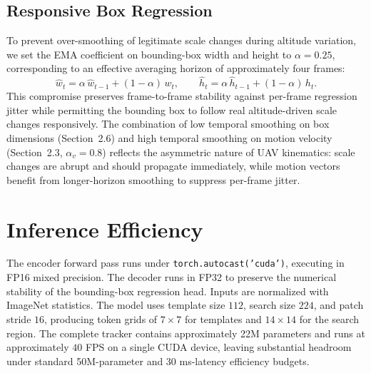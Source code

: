 \documentclass[10pt,twocolumn,letterpaper]{article}
\begin{document}
\subsection{Responsive Box Regression}

To prevent over-smoothing of legitimate scale changes during altitude variation, we set the EMA coefficient on bounding-box width and height to $\alpha = 0.25$, corresponding to an effective averaging horizon of approximately four frames:
\begin{equation}
\hat{w}_t = \alpha\, \hat{w}_{t-1} + (1-\alpha)\, w_t, \qquad
\hat{h}_t = \alpha\, \hat{h}_{t-1} + (1-\alpha)\, h_t.
\end{equation}
This compromise preserves frame-to-frame stability against per-frame regression jitter while permitting the bounding box to follow real altitude-driven scale changes responsively. The combination of low temporal smoothing on box dimensions (Section~2.6) and high temporal smoothing on motion velocity (Section~2.3, $\alpha_v = 0.8$) reflects the asymmetric nature of UAV kinematics: scale changes are abrupt and should propagate immediately, while motion vectors benefit from longer-horizon smoothing to suppress per-frame jitter.

\section{Inference Efficiency}

The encoder forward pass runs under \texttt{torch.autocast('cuda')}, executing in FP16 mixed precision. The decoder runs in FP32 to preserve the numerical stability of the bounding-box regression head. Inputs are normalized with ImageNet statistics. The model uses template size $112$, search size $224$, and patch stride $16$, producing token grids of $7 \times 7$ for templates and $14 \times 14$ for the search region. The complete tracker contains approximately 22M parameters and runs at approximately $40$ FPS on a single CUDA device, leaving substantial headroom under standard 50M-parameter and 30 ms-latency efficiency budgets.
\end{document}
